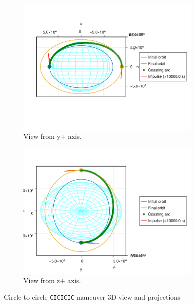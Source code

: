 \begin{figure}[htbp]
\begin{subfigure}{0.49\linewidth}
        \includegraphics[width=\linewidth]{../results/j2/hohmann/CICICIC_y+.png}
        \caption{View from y+ axis.}
    \end{subfigure}
    \begin{subfigure}{0.49\linewidth}
        \includegraphics[width=\linewidth]{../results/j2/hohmann/CICICIC_z+.png}
        \caption{View from z+ axis.}
    \end{subfigure}
    \caption{Circle to circle \texttt{CICICIC} maneuver 3D view and projections}
    \label{fig:j2_c2c_CICICIC_figs}
\end{figure}

